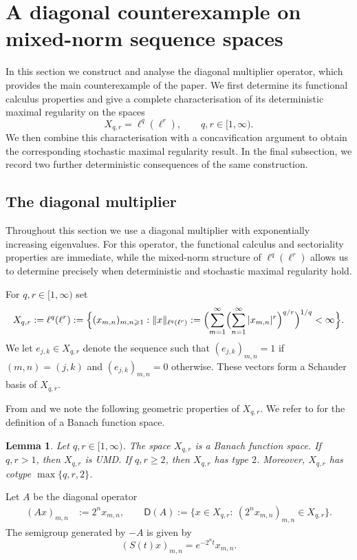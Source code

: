 \documentclass{amsart}
\let\ge\geqslant
\let\geq\geqslant
\theoremstyle{plain}
\theoremstyle{remark}
\theoremstyle{plain}
\newtheorem{lemma}[theorem]{Lemma}
\numberwithin{equation}{section}
\newcommand{\1}{\mathbf 1}
\newcommand{\norm}[1]{\|#1\|}
\newcommand{\Dom}{\mathsf{D}}
\begin{document}
\section{A diagonal counterexample on mixed-norm sequence spaces}
\label{sec:counter}

In this section we construct and analyse the diagonal multiplier operator, which provides the main counterexample of the paper. We first determine its functional calculus properties and give a complete characterisation of its deterministic maximal regularity on the spaces
\[
        X_{q,r}=\ell^q(\ell^r), \qquad q,r \in [1,\infty).
\]
We then combine this characterisation with a concavification argument to obtain the corresponding stochastic maximal regularity result. In the final subsection, we record two further deterministic consequences of the same construction.


\subsection{The diagonal multiplier}
\label{ss:diagonal-multiplier}
Throughout this section we use a diagonal multiplier with exponentially
increasing eigenvalues. For this operator, the functional calculus and
sectoriality properties are immediate, while the mixed-norm structure of
$\ell^q(\ell^r)$ allows us to determine precisely when deterministic and
stochastic maximal regularity hold.

For $q,r\in [1, \infty)$ set
\[
        X_{q,r}:=\ell^q(\ell^r):=\Bigl\{(x_{m,n})_{m,n\ge1}:\norm{x}_{\ell^q(\ell^r)}:=\Bigl(\sum_{m=1}^\infty\Bigl(\sum_{n=1}^\infty|x_{m,n}|^r\Bigr)^{q/r} \Bigr)^{1/q}<\infty \Bigr\}.
\]
We let $e_{j,k}\in X_{q,r}$ denote the sequence such that $(e_{j,k})_{m,n} =1$ if $(m,n) = (j,k)$ and $(e_{j,k})_{m,n} =0$ otherwise. These vectors form a Schauder basis of $X_{q,r}$.

From \cite[Section 4.2]{HNVW1} and \cite[Section 7.1]{HNVW2} we note the following geometric properties of $X_{q,r}$. We refer to \cite{LN24} for the definition of a Banach function space.

\begin{lemma}\label{lem:geometry}
Let $q,r\in [1, \infty)$. The space $X_{q,r}$ is a Banach function space. If $q,r>1$, then $X_{q,r}$ is UMD. If $q,r \geq 2$, then $X_{q,r}$ has type $2$. Moreover, $X_{q,r}$ has cotype $\max\{q,r,2\}$. 
\end{lemma}

Let $A$ be the diagonal operator
\begin{align}\label{eq:Aemndef}
        (Ax)_{m,n}&:=2^n x_{m,n},\qquad
        \Dom(A):=\{x\in X_{q,r}:\ (2^n x_{m,n})_{m,n}\in X_{q,r}\}.
\end{align}
The semigroup generated by $-A$ is given by
\[
        (S(t)x)_{m,n}=e^{-2^nt}x_{m,n}.
\]
\end{document}
